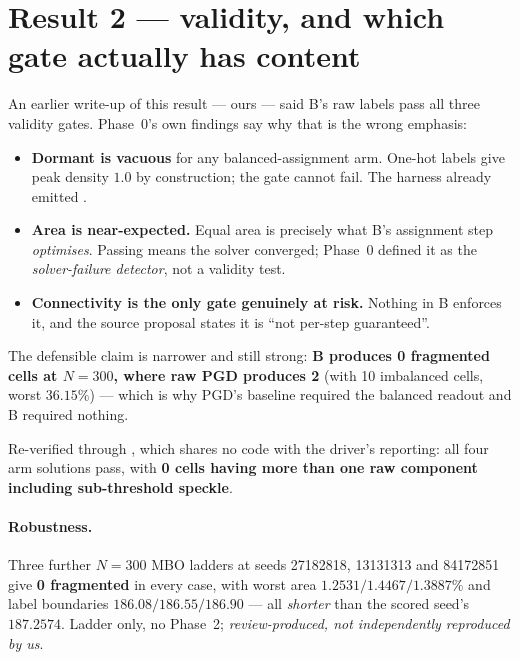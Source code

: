 \documentclass[11pt,a4paper]{article}
\begin{document}
\section{Result 2 --- validity, and which gate actually has content}
\label{sec:gates}

\begin{tcolorbox}[colback=red!3!white, colframe=red!45!black,
                  title={``All three gates pass'' is true and misleading}, fontupper=\small]
An earlier write-up of this result --- ours --- said B's raw labels pass all three
validity gates. Phase~0's own findings say why that is the wrong emphasis:
\begin{itemize}\itemsep1pt
  \item \textbf{Dormant is vacuous} for any balanced-assignment arm. One-hot labels
    give peak density \(1.0\) by construction; the gate cannot fail. The harness
    already emitted .
  \item \textbf{Area is near-expected.} Equal area is precisely what B's assignment
    step \emph{optimises}. Passing means the solver converged; Phase~0 defined it
    as the \emph{solver-failure detector}, not a validity test.
  \item \textbf{Connectivity is the only gate genuinely at risk.} Nothing in B
    enforces it, and the source proposal states it is ``not per-step guaranteed''.
\end{itemize}
The defensible claim is narrower and still strong: \textbf{B produces 0 fragmented
cells at \(N{=}300\), where raw PGD produces 2} (with 10 imbalanced cells, worst
\(36.15\%\)) --- which is why PGD's baseline required the balanced readout and B
required nothing.
\end{tcolorbox}

Re-verified through , which shares no code
with the driver's reporting: all four arm solutions pass, with \textbf{0 cells
having more than one raw component including sub-threshold speckle}.

\paragraph{Robustness.} Three further \(N{=}300\) MBO ladders at seeds 27182818,
13131313 and 84172851 give \textbf{0 fragmented} in every case, with worst area
\(1.2531/1.4467/1.3887\%\) and label boundaries \(186.08/186.55/186.90\) --- all
\emph{shorter} than the scored seed's \(187.2574\). Ladder only, no Phase~2;
\emph{review-produced, not independently reproduced by us}.
\end{document}
